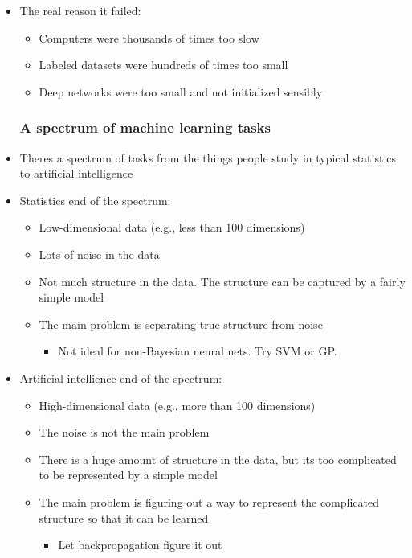 \begin{itemize}
	\item The real reason it failed:
	\begin{itemize}
		\item Computers were thousands of times too slow
		\item Labeled datasets were hundreds of times too small
		\item Deep networks were too small and not initialized sensibly
	\end{itemize}

	\subsubsection{A spectrum of machine learning tasks}
	\item Theres a spectrum of tasks from the things people study in typical statistics to artificial intelligence
	\item Statistics end of the spectrum:
	\begin{itemize}
		\item Low-dimensional data (e.g., less than 100 dimensions)
		\item Lots of noise in the data
		\item Not much structure in the data. The structure can be captured by a fairly simple model
		\item The main problem is separating true structure from noise
		\begin{itemize}
			\item Not ideal for non-Bayesian neural nets. Try SVM or GP.
		\end{itemize}
	\end{itemize}

	\item Artificial intellience end of the spectrum:
	\begin{itemize}
		\item High-dimensional data (e.g., more than 100 dimensions)
		\item The noise is not the main problem
		\item There is a huge amount of structure in the data, but its too complicated to be represented by a simple model
		\item The main problem is figuring out a way to represent the complicated structure so that it can be learned
		\begin{itemize}
			\item Let backpropagation figure it out
		\end{itemize}
	\end{itemize}


\end{itemize}
